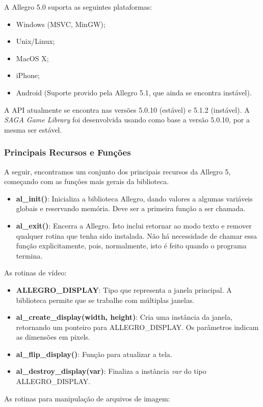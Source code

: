 \par
A Allegro 5.0 suporta as seguintes plataformas:
%
\begin{itemize}
 \item Windows (MSVC, MinGW);
 \item Unix/Linux;
 \item MacOS X;
 \item iPhone;
 \item Android (Suporte provido pela Allegro 5.1, que ainda se encontra instável).
\end{itemize}
%
A API atualmente se encontra nas versões 5.0.10 (estável) e 5.1.2 (instável). A \textit{SAGA Game Library} foi desenvolvida usando como base a versão 5.0.10, por a mesma ser estável.
%
\subsubsection{Principais Recursos e Funções}
%
A seguir, encontramos um conjunto dos principais recursos da Allegro 5, começando com as funções mais gerais da biblioteca.
%
\begin{itemize}
 \item \textbf{al\_init()}: Inicializa a biblioteca Allegro, dando valores a algumas variáveis globais e reservando memória. 
 Deve ser a primeira função a ser chamada.
 \item \textbf{al\_exit()}: Encerra a Allegro. Isto inclui retornar ao modo texto e remover qualquer rotina que tenha sido instalada. 
 Não há necessidade de chamar essa função explicitamente, pois, normalmente, isto é feito quando o programa termina.
\end{itemize}
%
As rotinas de vídeo:
%
\begin{itemize}
 \item \textbf{ALLEGRO\_DISPLAY}: Tipo que representa a janela principal. A biblioteca permite que se trabalhe com múltiplas janelas.
 \item \textbf{al\_create\_display(width, height)}: Cria uma instância da janela, retornando um ponteiro para ALLEGRO\_DISPLAY. 
 Os parâmetros indicam as dimensões em pixels.
 \item \textbf{al\_flip\_display()}: Função para atualizar a tela.
 \item \textbf{al\_destroy\_display(var)}: Finaliza a instância \textit{var} do tipo ALLEGRO\_DISPLAY\*.
\end{itemize}
%
As rotinas para manipulação de arquivos de imagem:
%
